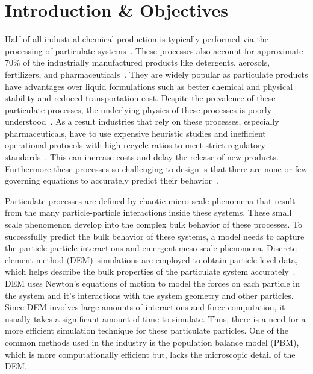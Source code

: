 \documentclass[preprint,11pt,authoryear]{elsarticle}
\begin{document}
\section{Introduction \& Objectives} 
Half of all industrial chemical production is typically performed via the
processing of particulate systems~\citep{seville1997}. These processes 
also account
for approximate 70\% of the industrially manufactured products like detergents, aerosols,
fertilizers, and pharmaceuticals~\citep{Litster2016}. They are
widely popular as particulate products have advantages over liquid
formulations such as better chemical and physical stability and reduced
transportation cost. Despite the prevalence of these particulate processes,
the underlying physics of these processes is poorly
understood~\citep{Rogers2013}. As a result industries that rely on these
processes, especially pharmaceuticals, have to use expensive heuristic studies
and inefficient operational protocols with high recycle ratios to meet strict
regulatory standards~\citep{Ramachandran2009}. This can increase costs and
delay the release of new products. Furthermore these processes so challenging
to design is that there are none or few governing equations to accurately
predict their behavior~\citep{sen2013}.

Particulate processes are defined by chaotic micro-scale phenomena that result
from the many particle-particle interactions inside these systems. These small
scale phenomenon develop into the complex bulk behavior of these processes. To
successfully predict the bulk behavior of these systems, a model needs to
capture the particle-particle interactions and emergent meso-scale phenomena. 
Discrete element method (DEM)~\citep{Cundall1979}simulations are employed 
to obtain particle-level data, which helps describe the bulk properties 
of the particulate system accurately~\citep{Hancock2011}. DEM uses Newton's 
equations of motion to model the forces on each particle in the system and 
it's interactions with the system geometry and other particles. Since DEM
involves large amounts of interactions and force computation, it usually takes
a significant amount of time to simulate. Thus, there is a need for a more efficient
simulation technique for these particulate particles. One of the common
methods used in the industry is the population balance model (PBM), which is
more computationally efficient but, lacks the microscopic detail of the DEM.
\end{document}
